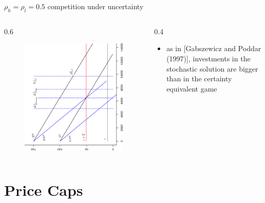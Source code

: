 \begin{frame} {$\rho_h = \rho_l = 0.5$ competition under uncertainty}
\begin{columns}
\begin{column} {0.6\textwidth}
\begin{figure}[h]
\centering
\includegraphics[width=1.0\textwidth, angle=270]{33}
    \label{fig:1}            
\end{figure}
\end{column}

\begin{column} {0.4\textwidth}



\begin{itemize}
\item as in [Gabszewicz and Poddar (1997)], investments in the stochastic solution are bigger than in the certainty equivalent game
\end{itemize}
\end{column}
\end{columns}
\end{frame}


\section{Price Caps}

